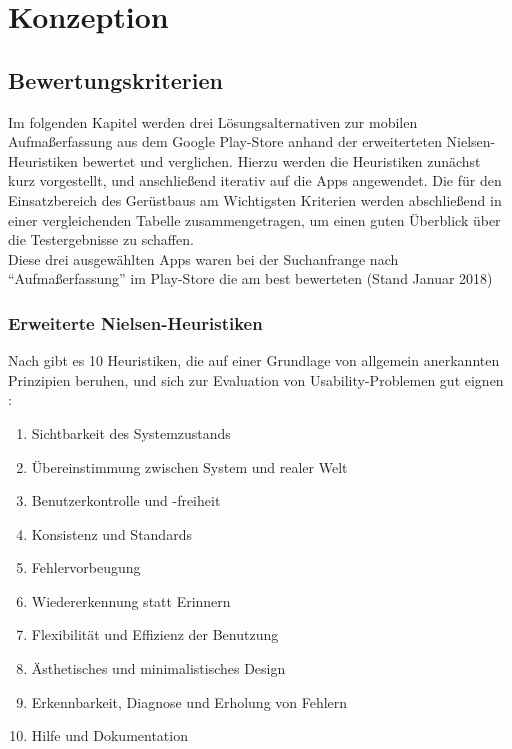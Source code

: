 \chapter{Konzeption}

\section{Bewertungskriterien}
 
 Im folgenden Kapitel werden drei Lösungsalternativen zur mobilen Aufmaßerfassung aus dem Google Play-Store anhand der erweiterteten Nielsen-Heuristiken  bewertet und verglichen.
Hierzu werden die Heuristiken zunächst kurz vorgestellt, und anschließend iterativ auf die Apps angewendet. Die für den Einsatzbereich des Gerüstbaus am Wichtigsten Kriterien werden abschließend in einer vergleichenden Tabelle zusammengetragen, um einen guten Überblick über die Testergebnisse zu schaffen. \\

 Diese drei ausgewählten Apps waren bei der Suchanfrange nach ``Aufmaßerfassung'' im Play-Store die am best bewerteten (Stand Januar 2018)
  \\
 
 
 \subsection{Erweiterte Nielsen-Heuristiken}
 Nach \citeauthor{Nielsen94} gibt es 10 Heuristiken, die auf einer Grundlage von allgemein anerkannten Prinzipien beruhen, und sich zur Evaluation von Usability-Problemen gut eignen \citep[Seite.~25--62]{Nielsen94}: 

\begin{enumerate}
	\item \label{itm:1} Sichtbarkeit des Systemzustands
	\item \label{itm:2} Übereinstimmung zwischen System und realer Welt
	\item \label{itm:3} Benutzerkontrolle und -freiheit
	\item \label{itm:4} Konsistenz und Standards
	\item \label{itm:5} Fehlervorbeugung
	\item \label{itm:6} Wiedererkennung statt Erinnern
	\item \label{itm:7} Flexibilität und Effizienz der Benutzung
	\item \label{itm:8} Ästhetisches und minimalistisches Design
	\item \label{itm:9} Erkennbarkeit, Diagnose und Erholung von Fehlern
	\item \label{itm:10} Hilfe und Dokumentation
\end{enumerate} 

